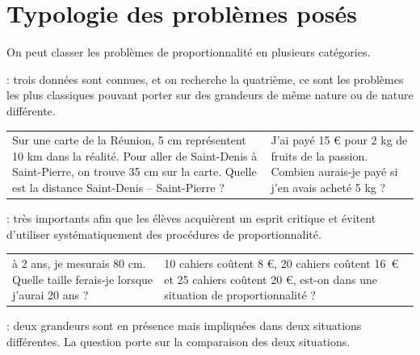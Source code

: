 \section{Typologie des problèmes posés}%

On peut classer les problèmes de proportionnalité en plusieurs catégories.

 : trois données sont connues, et on recherche la quatrième, ce sont les problèmes les plus classiques pouvant porter sur des grandeurs de même nature ou de nature différente.
   
\begin{center}
{\renewcommand{\arraystretch}{1.2}
\begin{tabular}{|p{7cm}|p{7cm}|}
   \hline
   \cellcolor{FondTableaux}{Grandeurs de même nature}
   &
   \cellcolor{FondTableaux}{Grandeurs de nature différente} \\
   \hline
   Sur une carte de la Réunion, 5 cm représentent 10 km dans la réalité. Pour aller de Saint-Denis à Saint-Pierre, on trouve 35 cm sur la carte. Quelle est la distance Saint-Denis -- Saint-Pierre ?
   &
   J'ai payé 15 \euro{} pour 2 kg de fruits de la passion. Combien aurais-je payé si j'en avais acheté 5 kg ? \\
   \hline
\end{tabular}}
\end{center}
   
 : très importants afin que les élèves acquièrent un esprit critique et évitent d'utiliser systématiquement des procédures de proportionnalité.

\begin{center}
{\renewcommand{\arraystretch}{1.2}
\begin{tabular}{|p{7cm}|p{7cm}|}
   \hline
   \cellcolor{FondTableaux}{Proportionnalité or not ?}
   &
   \cellcolor{FondTableaux}{Proportionnalité or not ?... bis} \\
   \hline
   à 2 ans, je mesurais 80 cm. \newline
   Quelle taille ferais-je lorsque j'aurai 20 ans ?
   &
   10 cahiers coûtent 8 \euro{}, 20 cahiers coûtent 16~\euro{} et 25 cahiers coûtent 20 \euro{}, est-on dans une situation de proportionnalité ? \\
   \hline
\end{tabular}}
\end{center}

 : deux grandeurs sont en présence mais impliquées dans deux situations différentes. La question porte sur la comparaison des deux situations.
   
